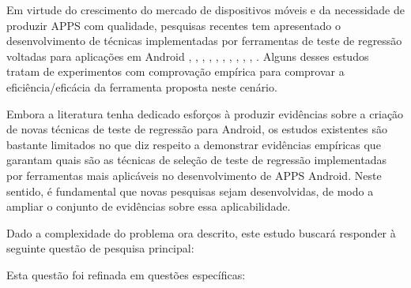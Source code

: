 Em virtude do crescimento do mercado de dispositivos móveis e da necessidade de produzir \ac{APPS} com qualidade, pesquisas recentes tem apresentado o desenvolvimento de técnicas implementadas por ferramentas de teste de regressão voltadas para aplicações em Android \cite{Do2016RedroidAR}, \cite{Choi:2018:DMA:3180155.3180173}, \cite{8377661}, \cite{5954416}, \cite{7927972}, \cite{8424973}, \cite{6339502}, \cite{6569773}, \cite{7427895}, \cite{7832883}, \cite{7833000}. Alguns desses estudos tratam de experimentos com comprovação empírica para comprovar a eficiência/eficácia da ferramenta proposta neste cenário.

Embora a literatura tenha dedicado esforços à produzir evidências sobre a criação de novas técnicas de teste de regressão para Android, os estudos existentes são bastante limitados no que diz respeito a demonstrar evidências empíricas que garantam quais são as técnicas de seleção de teste de regressão implementadas por ferramentas mais aplicáveis no desenvolvimento de \ac{APPS} Android. Neste sentido, é fundamental que novas pesquisas sejam desenvolvidas, de modo a ampliar o conjunto de evidências sobre essa aplicabilidade. 

Dado a complexidade do problema ora descrito, este estudo buscará responder à seguinte questão de pesquisa principal:
\leavevspace 

\begin{center}
    \noindent{}
\end{center}

\vspace{.5em}

Esta questão foi refinada em questões específicas:
\vspace{.5em}

